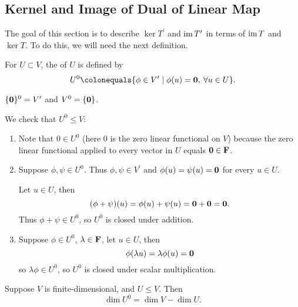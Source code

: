\subsection{Kernel and Image of Dual of Linear Map}
The goal of this section is to describe $\ker T^\prime$ and $\operatorname{im} T^\prime$ in terms of $\operatorname{im} T$ and $\ker T$. 
To do this, we will need the next definition.

\begin{definition}[Annihilator]
For $U\subset V$, the  of $U$ is defined by
\[U^0\colonequals\{\phi\in V^\prime\mid\phi(u)=\vb{0},\:\forall u\in U\}.\]
\end{definition}

\begin{example}
$\{\vb{0}\}^0=V^\prime$ and $V^0=\{\vb{0}\}$.
\end{example}

We check that $U^0\le V$:
\begin{enumerate}[label=(\roman*)]
\item Note that $0\in U^0$ (here $0$ is the zero linear functional on $V$) because the zero linear functional applied to every vector in $U$ equals $\vb{0}\in\mathbf F$.
\item Suppose $\phi,\psi\in U^0$. Thus $\phi,\psi\in V^\prime$ and $\phi(u)=\psi(u)=\vb{0}$ for every $u\in U$.

Let $u\in U$, then
\[(\phi+\psi)(u)=\phi(u)+\psi(u)=\vb{0}+\vb{0}=\vb{0}.\]
Thus $\phi+\psi\in U^0$, so $U^0$ is closed under addition.

\item Suppose $\phi\in U^0$, $\lambda\in\mathbf F$, let $u\in U$, then
\[\phi(\lambda u)=\lambda\phi(u)=\vb{0}\]
so $\lambda\phi\in U^0$, so $U^0$ is closed under scalar multiplication.
\end{enumerate}

\begin{lemma}\label{lemma:dimension-annihilator}
Suppose $V$ is finite-dimensional, and $U\le V$. Then
\[\dim U^0=\dim V-\dim U.\]
\end{lemma}

